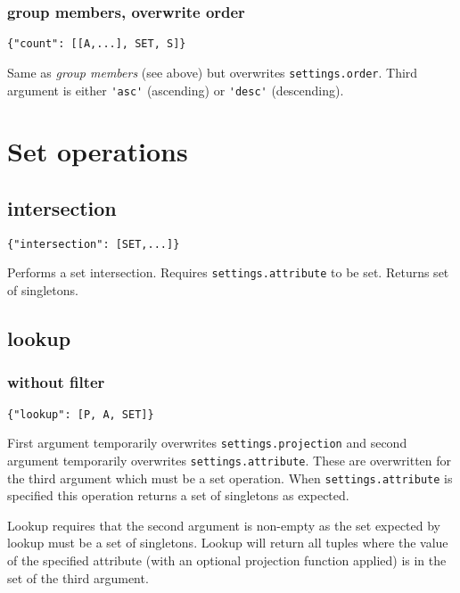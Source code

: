 \documentclass[12pt]{article}
\begin{document}
\subsubsection{group members, overwrite order}

\begin{verbatim}
{"count": [[A,...], SET, S]}
\end{verbatim}

Same as \textit{group members} (see above) but overwrites \verb|settings.order|. Third argument is either \verb|'asc'| (ascending)
or \verb|'desc'| (descending).

\section{Set operations}

\subsection{intersection}

\begin{verbatim}
{"intersection": [SET,...]}
\end{verbatim}

Performs a set intersection. Requires \verb|settings.attribute| to be set. Returns set of singletons.

\subsection{lookup}

\subsubsection{without filter}

\begin{verbatim}
{"lookup": [P, A, SET]}
\end{verbatim}

First argument temporarily overwrites \verb|settings.projection| and second argument temporarily overwrites \verb|settings.attribute|. These are overwritten
for the third argument which must be a set operation. When \verb|settings.attribute| is specified this operation returns a set of singletons as expected.

Lookup requires that the second argument is non-empty as the set expected by lookup must be a set of singletons. Lookup will return all tuples 
where the value of the specified attribute (with an optional projection function applied) is in the set of the third argument. 
\end{document}
